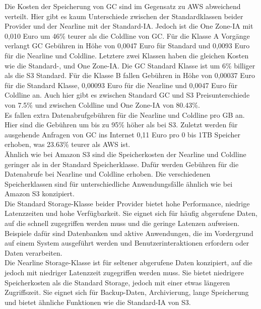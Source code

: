 Die Kosten der Speicherung von GC sind im Gegensatz zu AWS abweichend verteilt. Hier gibt es kaum Unterschiede zwischen der Standardklassen beider Provider und der Nearline mit der Standard-IA. Jedoch ist die One Zone-IA mit 0,010 Euro um 46\% teurer als die Coldline von GC. Für die Klasse A Vorgänge verlangt GC Gebühren in Höhe von 0,0047 Euro für Standard und 0,0093 Euro für die Nearline und Coldline. Letztere zwei Klassen haben die gleichen Kosten wie die Standard-, und One Zone-IA. Die GC Standard Klasse ist um 6\% billiger als die S3 Standard. Für die Klasse B fallen Gebühren in Höhe von 0,00037 Euro für die Standard Klasse, 0,00093 Euro für die Nearline und 0,0047 Euro für Coldline an. Auch hier gibt es zwischen Standard GC und S3 Preisunterschiede von 7.5\% und zwischen Coldline und One Zone-IA von 80.43\%.\\ 

Es fallen extra Datenabrufgebühren für die Nearline und Coldline pro GB an. Hier sind die Gebühren um bis zu 95\% höher als bei S3. Zuletzt werden für ausgehende Anfragen von GC ins Internet 0,11 Euro pro 0 bis 1TB Speicher erhoben, was 23.63\% teurer als AWS ist.\\

Ähnlich wie bei Amazon S3 sind die Speicherkosten der Nearline und Coldline geringer als in der Standard Speicherklasse. Dafür werden Gebühren für die Datenabrufe bei Nearline und Coldline erhoben. Die verschiedenen Speicherklassen sind für unterschiedliche Anwendungsfälle ähnlich wie bei Amazon S3 konzipiert.\\

Die Standard Storage-Klasse beider Provider bietet hohe Performance, niedrige Latenzzeiten und hohe Verfügbarkeit. Sie eignet sich für häufig abgerufene Daten, auf die schnell zugegriffen werden muss und die geringe Latenzen aufweisen. Beispiele dafür sind Datenbanken und aktive Anwendungen, die im Vordergrund auf einem System ausgeführt werden und Benutzerinteraktionen erfordern oder Daten verarbeiten.\\ 

Die Nearline Storage-Klasse ist für seltener abgerufene Daten konzipiert, auf die jedoch mit niedriger Latenzzeit zugegriffen werden muss. Sie bietet niedrigere Speicherkosten als die Standard Storage, jedoch mit einer etwas längeren Zugriffszeit. Sie eignet sich für Backup-Daten, Archivierung, lange Speicherung und bietet ähnliche Funktionen wie die Standard-IA von S3.\\

